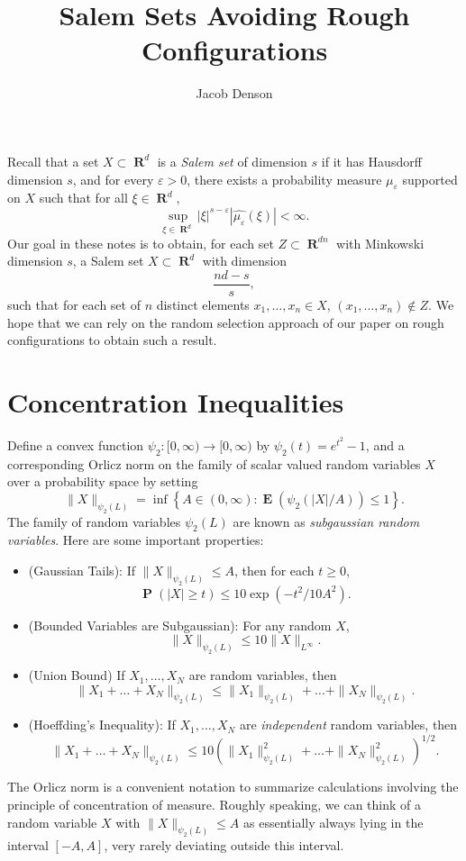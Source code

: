 \documentclass[12pt,reqno]{article}
\title{Salem Sets Avoiding Rough Configurations}
\author{Jacob Denson}
\DeclareMathOperator{\RR}{\mathbf{R}}
\DeclareMathOperator{\EE}{\mathbf{E}}
\DeclareMathOperator{\PP}{\mathbf{P}}
\newcommand{\psitwo}[1]{\| {#1} \|_{\psi_2(L)}}
\begin{document}
\maketitle

Recall that a set $X \subset \RR^d$ is a \emph{Salem set} of dimension $s$ if it has Hausdorff dimension $s$, and for every $\varepsilon > 0$, there exists a probability measure $\mu_\varepsilon$ supported on $X$ such that for all $\xi \in \RR^d$,
%
\[ \sup_{\xi \in \RR^d} |\xi|^{s - \varepsilon} |\widehat{\mu_\varepsilon}(\xi)| < \infty. \]
%
Our goal in these notes is to obtain, for each set $Z \subset \RR^{dn}$ with Minkowski dimension $s$, a Salem set $X \subset \RR^d$ with dimension
%
\[ \frac{nd - s}{s}, \]
%
such that for each set of $n$ distinct elements $x_1, \dots, x_n \in X$, $(x_1, \dots, x_n) \not \in Z$. We hope that we can rely on the random selection approach of our paper on rough configurations to obtain such a result.

\section{Concentration Inequalities}

Define a convex function $\psi_2: [0,\infty) \to [0,\infty)$ by $\psi_2(t) = e^{t^2} - 1$, and a corresponding Orlicz norm on the family of scalar valued random variables $X$ over a probability space by setting
%
\[ \psitwo{X} = \inf \left\{ A \in (0,\infty) : \EE(\psi_2(|X|/A)) \leq 1 \right\}. \]
%
The family of random variables $\psi_2(L)$ are known as \emph{subgaussian random variables}. Here are some important properties:
%
\begin{itemize}
	\item (Gaussian Tails): If $\psitwo{X} \leq A$, then for each $t \geq 0$,
	\[ \PP \left( |X| \geq t \right) \leq 10 \exp \left( -t^2/10A^2 \right). \]

	\item (Bounded Variables are Subgaussian): For any random $X$,
	\[ \psitwo{X} \leq 10 \| X \|_{L^\infty}. \]

	
	\item (Union Bound) If $X_1, \dots, X_N$ are random variables, then
	\[ \psitwo{X_1 + \dots + X_N} \leq \psitwo{X_1} + \dots + \psitwo{X_N}. \]
	
	\item (Hoeffding's Inequality): If $X_1, \dots, X_N$ are \emph{independent} random variables, then
	\[ \psitwo{X_1 + \dots + X_N} \leq 10 \left( \psitwo{X_1}^2 + \dots + \psitwo{X_N}^2 \right)^{1/2}. \]
\end{itemize}
%
The Orlicz norm is a convenient notation to summarize calculations involving the principle of concentration of measure. Roughly speaking, we can think of a random variable $X$ with $\psitwo{X} \leq A$ as essentially always lying in the interval $[-A,A]$, very rarely deviating outside this interval.
\end{document}
